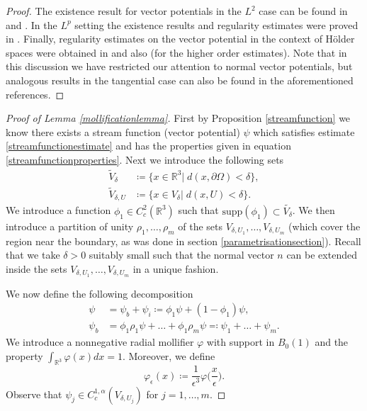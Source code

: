 \documentclass[12pt,a4paper]{article}
\theoremstyle{definition}
\theoremstyle{remark}
\numberwithin{equation}{section}
\begin{document}
\begin{proof}
The existence result for vector potentials in the $L^2$ case can be found in \cite[~Lemma 3.5 and Theorem 3.17]{amrouche} and \cite[~Theorem 3.4 and Theorem 3.6]{girault}. In the $L^p$ setting the existence results and regularity estimates were proved in \cite[~Lemma 4.1 and Theorem 4.3]{amrouche2013}. Finally, regularity estimates on the vector potential in the context of Hölder spaces were obtained in \cite[~Theorem 2.1]{bolik} and also \cite[~Proposition 2.1]{bates} (for the higher order estimates). Note that in this discussion we have restricted our attention to normal vector potentials, but analogous results in the tangential case can also be found in the aforementioned references.
\end{proof}
\begin{proof}[Proof of Lemma \ref{mollificationlemma}]
First by Proposition \ref{streamfunction} we know there exists a stream function (vector potential) $\psi$ which satisfies estimate \eqref{streamfunctionestimate} and has the properties given in equation \eqref{streamfunctionproperties}. Next we introduce the following sets
\begin{align}
\widetilde{V}_\delta &\coloneqq \{ x \in \mathbb{R}^3 \lvert \; d(x, \partial \Omega) < \delta \}, \\
\widetilde{V}_{\delta , U} &\coloneqq  \{ x \in V_\delta \lvert \; d(x, U) < \delta \}.
\end{align}
We introduce a function $\phi_1 \in C^2_c (\mathbb{R}^3)$ such that $\text{supp} (\phi_1) \subset \widetilde{V_\delta}$. We then introduce a partition of unity $\rho_1, \ldots, \rho_m$ of the sets $V_{\delta, U_1}, \ldots, V_{\delta, U_m}$ (which cover the region near the boundary, as was done in section \ref{parametrisationsection}). Recall that we take $\delta > 0$ suitably small such that the normal vector $n$ can be extended inside the sets $V_{\delta, U_1}, \ldots, V_{\delta, U_m}$ in a unique fashion.

We now define the following decomposition
\begin{align*}
\psi &= \psi_b + \psi_i \coloneqq \phi_1 \psi + (1- \phi_1) \psi, \\
\psi_b &= \phi_1 \rho_1 \psi + \ldots + \phi_1 \rho_m \psi \eqqcolon \psi_1 + \ldots + \psi_m.
\end{align*}
We introduce a nonnegative radial mollifier $\varphi$ with support in $B_0 (1)$ and the property $\int_{\mathbb{R}^3} \varphi (x) dx = 1$. Moreover, we define
\begin{equation*}
\varphi_\epsilon (x) \coloneqq \frac{1}{\epsilon^3} \varphi \bigg( \frac{x}{\epsilon} \bigg).
\end{equation*}
Observe that $\psi_j \in C^{1, \alpha}_c (V_{\delta, U_j}) $ for $j=1, \ldots, m$. 


\end{proof}
\end{document}
